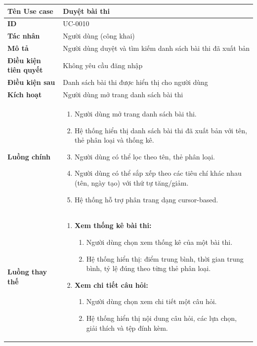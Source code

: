 {
\renewcommand{\arraystretch}{1.5}

\begin{tabularx}{\textwidth}{|>{\raggedright\arraybackslash}X|>{\raggedright\arraybackslash}X|}
\hline
\textbf{Tên Use case} & Duyệt bài thi \\
\hline
\textbf{ID} & UC-0010 \\
\hline
\textbf{Tác nhân} & Người dùng (công khai) \\
\hline
\textbf{Mô tả} & Người dùng duyệt và tìm kiếm danh sách bài thi đã xuất bản \\
\hline
\textbf{Điều kiện tiên quyết} & Không yêu cầu đăng nhập \\
\hline
\textbf{Điều kiện sau} & Danh sách bài thi được hiển thị cho người dùng \\
\hline
\textbf{Kích hoạt} & Người dùng mở trang danh sách bài thi \\
\hline
\textbf{Luồng chính} &
\begin{enumerate}
    \item Người dùng mở trang danh sách bài thi.
    \item Hệ thống hiển thị danh sách bài thi đã xuất bản với tên, thẻ phân loại và thống kê.
    \item Người dùng có thể lọc theo tên, thẻ phân loại.
    \item Người dùng có thể sắp xếp theo các tiêu chí khác nhau (tên, ngày tạo) với thứ tự tăng/giảm.
    \item Hệ thống hỗ trợ phân trang dạng cursor-based.
\end{enumerate} \\
\hline
\textbf{Luồng thay thế} &
\begin{enumerate}
    \item \textbf{Xem thống kê bài thi:}
    \begin{enumerate}
        \item[3A.] Người dùng chọn xem thống kê của một bài thi.
        \item[4A.] Hệ thống hiển thị: điểm trung bình, thời gian trung bình, tỷ lệ đúng theo từng thẻ phân loại.
    \end{enumerate}
    \item \textbf{Xem chi tiết câu hỏi:}
    \begin{enumerate}
        \item[3B.] Người dùng chọn xem chi tiết một câu hỏi.
        \item[4B.] Hệ thống hiển thị nội dung câu hỏi, các lựa chọn, giải thích và tệp đính kèm.

\end{enumerate}
\end{enumerate}
\end{tabularx}}
